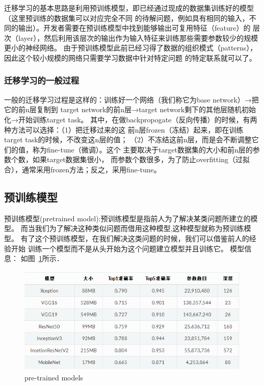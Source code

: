 迁移学习的基本思路是利用预训练模型，即已经通过现成的数据集训练好的模型（这里预训练的数据集可以对应完全不同
的待解问题，例如具有相同的输入，不同的输出）。开发者需要在预训练模型中找到能够输出可复用特征（feature）的
层次（layer），然后利用该层次的输出作为输入特征来训练那些需要参数较少的规模更小的神经网络。
由于预训练模型此前已经习得了数据的组织模式（patterns），因此这个较小规模的网络只需要学习数据中针对特定问题
的特定联系就可以了。

\subsubsection{迁移学习的一般过程}

一般的迁移学习过程是这样的：训练好一个网络（我们称它为base network）→把它的前n层复制到
target network的前n层→target network剩下的其他层随机初始化→开始训练target task。
其中，在做backpropogate（反向传播）的时候，有两种方法可以选择：（1）把迁移过来的这
前n层frozen（冻结）起来，即在训练target task的时候，不改变这n层的值；
（2）不冻结这前n层，而是会不断调整它们的值，称为fine-tune（微调）。这个
主要取决于target数据集的大小和前n层的参数个数，如果target数据集很小，
而参数个数很多，为了防止overfitting（过拟合），通常采用frozen方法；反之，采用fine-tune。

\subsection{预训练模型}
预训练模型(pretrained model):预训练模型是指前人为了解决某类问题所建立的模型。
而当我们为了解决这种类似问题而借用这种模型,这种模型就称为预训练模型。
有了这个预训练模型，在我们解决这类问题的时候，我们可以借鉴前人的经验开始
训练一个模型而不是从头开始为这个问题建立模型并且训练它。
模型信息：
如图~\ref{pre-trained models}所示．
\begin{figure}[!htbp]
	\centering	\includegraphics[width=12cm]{pic/assets/premodels}
    \caption{pre-trained models}	\label{pre-trained models}	\end{figure}


